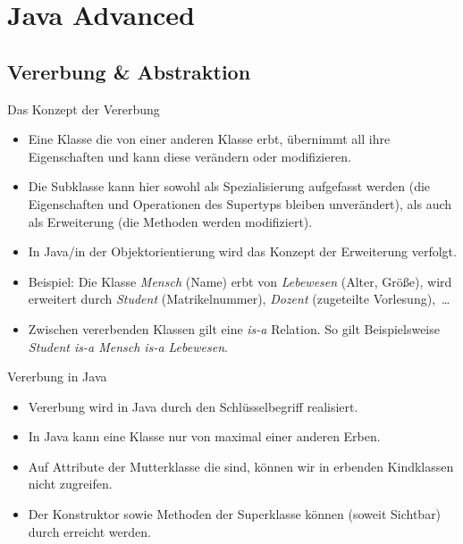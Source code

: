 
\section{Java Advanced}

\subsection{Vererbung \& Abstraktion}

\begin{frame}{Das Konzept der Vererbung}
    \hypertarget<1>{mrk:Vererbung}{}%
    \begin{itemize}[<+(1)->]
        \item Eine Klasse die von einer anderen Klasse erbt, übernimmt all ihre Eigenschaften und kann diese verändern oder modifizieren.
        \item Die Subklasse kann hier sowohl als Spezialisierung aufgefasst werden (die Eigenschaften und Operationen des Supertyps bleiben unverändert),\pause{} als auch als Erweiterung (die Methoden werden modifiziert).
        \item In Java/in der Objektorientierung wird das Konzept der Erweiterung verfolgt.
        \item Beispiel: Die Klasse \emph{Mensch} (Name) erbt von \emph{Lebewesen} (Alter, Größe),\pause{} wird erweitert durch \emph{Student} (Matrikelnummer), \emph{Dozent} (zugeteilte Vorlesung),~\ldots
        \item Zwischen vererbenden Klassen gilt eine \emph{is-a} Relation.\pause{} So gilt Beispielsweise \emph{Student is-a Mensch is-a Lebewesen}.
    \end{itemize}
\end{frame}

\begin{frame}{Vererbung in Java}
    \begin{itemize}[<+(1)->]
        \item Vererbung wird in Java durch den Schlüsselbegriff  realisiert.
        \item In Java kann eine Klasse nur von maximal einer anderen Erben.
        \item Auf Attribute der Mutterklasse die  sind,\pause{} können wir in erbenden Kindklassen nicht zugreifen.
        \item Der Konstruktor sowie Methoden der Superklasse können (soweit Sichtbar) durch  erreicht werden.
    \end{itemize}
\end{frame}


